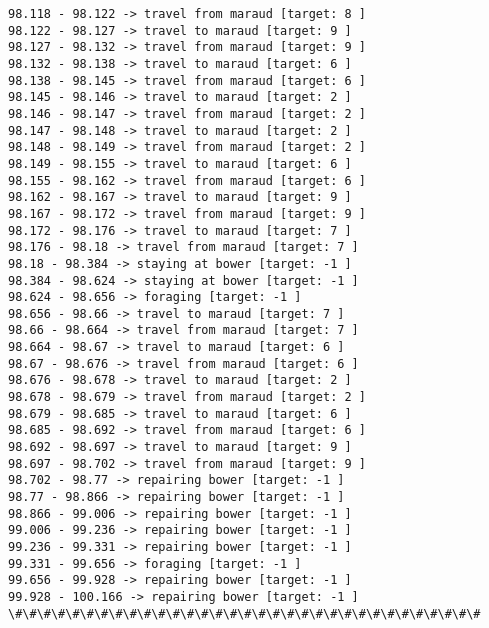 \documentclass[11pt]{article}
\begin{document}
\begin{Verbatim}[commandchars=\\\{\}]
98.118 - 98.122 -> travel from maraud [target: 8 ]
98.122 - 98.127 -> travel to maraud [target: 9 ]
98.127 - 98.132 -> travel from maraud [target: 9 ]
98.132 - 98.138 -> travel to maraud [target: 6 ]
98.138 - 98.145 -> travel from maraud [target: 6 ]
98.145 - 98.146 -> travel to maraud [target: 2 ]
98.146 - 98.147 -> travel from maraud [target: 2 ]
98.147 - 98.148 -> travel to maraud [target: 2 ]
98.148 - 98.149 -> travel from maraud [target: 2 ]
98.149 - 98.155 -> travel to maraud [target: 6 ]
98.155 - 98.162 -> travel from maraud [target: 6 ]
98.162 - 98.167 -> travel to maraud [target: 9 ]
98.167 - 98.172 -> travel from maraud [target: 9 ]
98.172 - 98.176 -> travel to maraud [target: 7 ]
98.176 - 98.18 -> travel from maraud [target: 7 ]
98.18 - 98.384 -> staying at bower [target: -1 ]
98.384 - 98.624 -> staying at bower [target: -1 ]
98.624 - 98.656 -> foraging [target: -1 ]
98.656 - 98.66 -> travel to maraud [target: 7 ]
98.66 - 98.664 -> travel from maraud [target: 7 ]
98.664 - 98.67 -> travel to maraud [target: 6 ]
98.67 - 98.676 -> travel from maraud [target: 6 ]
98.676 - 98.678 -> travel to maraud [target: 2 ]
98.678 - 98.679 -> travel from maraud [target: 2 ]
98.679 - 98.685 -> travel to maraud [target: 6 ]
98.685 - 98.692 -> travel from maraud [target: 6 ]
98.692 - 98.697 -> travel to maraud [target: 9 ]
98.697 - 98.702 -> travel from maraud [target: 9 ]
98.702 - 98.77 -> repairing bower [target: -1 ]
98.77 - 98.866 -> repairing bower [target: -1 ]
98.866 - 99.006 -> repairing bower [target: -1 ]
99.006 - 99.236 -> repairing bower [target: -1 ]
99.236 - 99.331 -> repairing bower [target: -1 ]
99.331 - 99.656 -> foraging [target: -1 ]
99.656 - 99.928 -> repairing bower [target: -1 ]
99.928 - 100.166 -> repairing bower [target: -1 ]
\#\#\#\#\#\#\#\#\#\#\#\#\#\#\#\#\#\#\#\#\#\#\#\#\#\#\#\#\#\#\#\#\#



\end{Verbatim}
\end{document}
